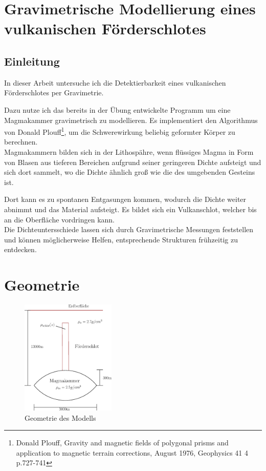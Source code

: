 \documentclass[12pt,a4paper]{scrartcl}
\begin{document}
\section*{Gravimetrische Modellierung eines vulkanischen Förderschlotes}

\subsection*{Einleitung}

In dieser Arbeit untersuche ich die Detektierbarkeit eines vulkanischen Förderschlotes per Gravimetrie.

Dazu nutze ich das bereits in der Übung entwickelte Programm um eine Magmakammer gravimetrisch zu modellieren.
Es implementiert den Algorithmus von Donald Plouff\footnote{Donald Plouff, Gravity and magnetic fields of polygonal prisms and application to magnetic terrain corrections, August 1976, Geophysics 41 4 p.727-741}, um die Schwerewirkung beliebig geformter Körper zu berechnen.\\

Magmakammern bilden sich in der Lithospähre, wenn flüssiges Magma in Form von Blasen aus tieferen Bereichen aufgrund seiner geringeren Dichte aufsteigt und sich dort sammelt, wo die Dichte ähnlich groß wie die des umgebenden Gesteins ist.

Dort kann es zu spontanen Entgasungen kommen, wodurch die Dichte weiter abnimmt und das Material aufsteigt. 
Es bildet sich ein Vulkanschlot, welcher bis an die Oberfläche vordringen kann.\\

Die Dichteuntersschiede lassen sich durch Gravimetrische Messungen feststellen und können möglicherweise Helfen, entsprechende Strukturen frühzeitig zu entdecken.

\clearpage
\section*{Geometrie}

\begin{figure}[htb]
\centering
\includegraphics[width=0.4\textwidth]{../figures/geometry}
\caption{Geometrie des Modells}
\label{geometry}
\end{figure}
\end{document}
